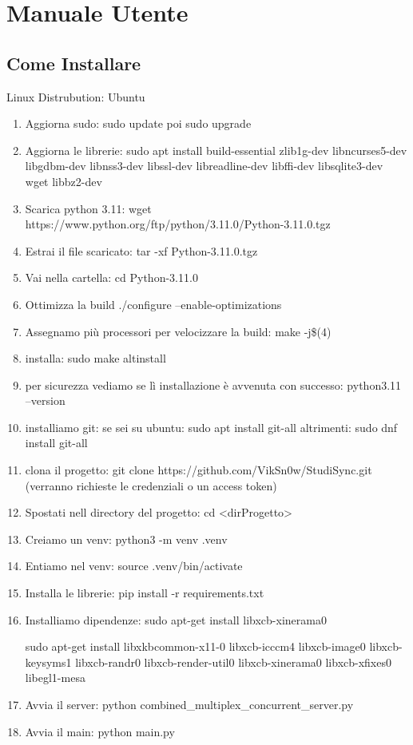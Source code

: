 \documentclass{article}
\begin{document}
\newpage

\section{Manuale Utente}
\subsection{Come Installare}
Linux Distrubution: Ubuntu
\begin{enumerate}
    \item Aggiorna sudo: sudo update poi sudo upgrade
    \item Aggiorna le librerie: sudo apt install build-essential zlib1g-dev libncurses5-dev libgdbm-dev libnss3-dev libssl-dev libreadline-dev libffi-dev libsqlite3-dev wget libbz2-dev
    \item Scarica python 3.11: wget https://www.python.org/ftp/python/3.11.0/Python-3.11.0.tgz
    \item Estrai il file scaricato: tar -xf Python-3.11.0.tgz
    \item Vai nella cartella: cd Python-3.11.0
    \item Ottimizza la build ./configure --enable-optimizations
    \item Assegnamo più processori per velocizzare la build: make -j\$(4)
    \item installa: sudo make altinstall
    \item per sicurezza vediamo se lì installazione è avvenuta con successo: python3.11 --version
    \item installiamo git: se sei su ubuntu: sudo apt install git-all altrimenti: sudo dnf install git-all
    \item clona il progetto:  git clone https://github.com/VikSn0w/StudiSync.git (verranno richieste le credenziali o un access token)
    \item Spostati nell directory del progetto: cd <dirProgetto>
    \item Creiamo un venv: python3 -m venv .venv
    \item Entiamo nel venv: source .venv/bin/activate
    \item Installa le librerie: pip install -r requirements.txt
    \item Installiamo dipendenze: 
    sudo apt-get install libxcb-xinerama0
    
    sudo apt-get install libxkbcommon-x11-0 libxcb-icccm4 libxcb-image0 libxcb-keysyms1 libxcb-randr0 libxcb-render-util0 libxcb-xinerama0 libxcb-xfixes0 libegl1-mesa
    \item Avvia il server: python combined\_multiplex\_concurrent\_server.py
    \item Avvia il main: python main.py
\end{enumerate}
\end{document}
